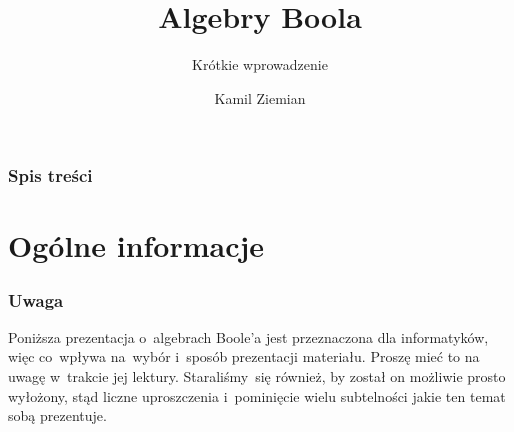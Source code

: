 \documentclass[10pt,t]{beamer}
\title{Algebry Boola}
\subtitle{Krótkie wprowadzenie}
\author{Kamil Ziemian}
\begin{document}





\RaggedRight





\maketitle





\begin{frame}
  \frametitle{Spis treści}


  \tableofcontents

\end{frame}










\section{Ogólne informacje}



\begin{frame}
  \frametitle{Uwaga}


  Poniższa prezentacja o~algebrach Boole’a jest przeznaczona dla
  informatyków, więc co~wpływa na~wybór i~sposób prezentacji materiału.
  Proszę mieć to na uwagę w~trakcie jej lektury. Staraliśmy~się również,
  by został on możliwie prosto wyłożony, stąd liczne uproszczenia
  i~pominięcie wielu subtelności jakie ten temat sobą prezentuje.

\end{frame}
\end{document}
